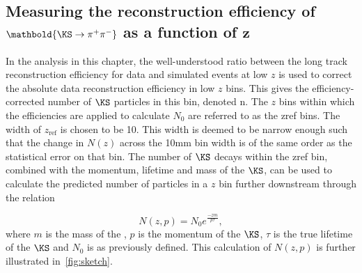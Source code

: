 \subsection[{Measuring the reconstruction efficiency of $\KS\to\pi^{+}\pi^{-}$ as a function of $z$}]{Measuring the reconstruction efficiency of $\mathbold{\KS\to\pi^{+}\pi^{-}}$ as a function of $\mathbold{z}$}
\label{sec:methodintro}


In the analysis in this chapter, the well-understood ratio between the long track reconstruction efficiency for data and simulated events at low $z$ is used to correct the absolute data reconstruction efficiency in low $z$ bins. This gives the efficiency-corrected number of $\KS$ particles in this bin, denoted \gls{n}. The $z$ bins within which the efficiencies are applied to calculate $N_{0}$ are referred to as the \gls{zref} bins. The width of $z_{\textrm{ref}}$ is chosen to be 10\mm. This width is deemed to be narrow enough such that the change in $N(z)$ across the 10mm bin width is of the same order as the statistical error on that bin. The number of $\KS$ decays within the \gls{zref} bin, combined with the momentum, lifetime and mass of the $\KS$, can be used to calculate the predicted number of \KS particles in a $z$ bin further downstream through the relation

\begin{equation}
  N(z,p) = N_{0} e ^{\frac{-zm}{p\tau }},
  \label{eq:extra}
\end{equation}
where $m$ is the mass of the \KS, $p$ is the momentum of the $\KS$, $\tau$ is the true lifetime of the $\KS$ and $N_{0}$ is as previously defined. This calculation of $N(z,p)$ is further illustrated in~\autoref{fig:sketch}.

